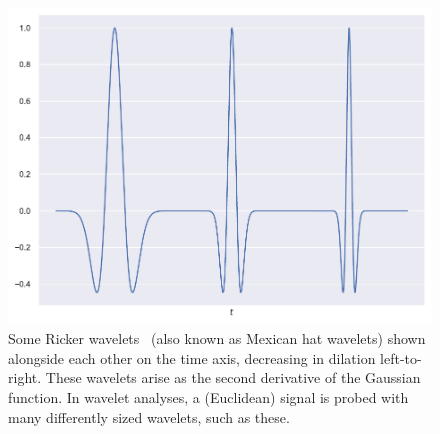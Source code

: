 \begin{figure}[htpb]
	\centering\capstart{}
	\includegraphics[width=\textwidth]{ricker_wavelets.pdf}
	\caption[
        A few Ricker wavelets
	]{
        Some Ricker wavelets~\cite{Ricker1953} (also known as Mexican hat wavelets) shown alongside each other on the time axis, decreasing in dilation left-to-right.
        These wavelets arise as the second derivative of the Gaussian function.
        In wavelet analyses, a (Euclidean) signal is probed with many differently sized wavelets, such as these.
	}\label{fig:chapter2_ricker_wavelets}
\end{figure}
